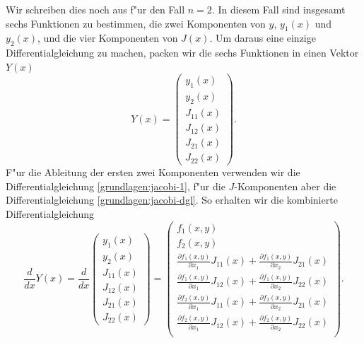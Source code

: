Wir schreiben dies noch aus f"ur den Fall $n=2$.
In diesem Fall sind insgesamt sechs Funktionen zu bestimmen, die
zwei Komponenten von $y$, $y_1(x)$ und $y_2(x)$, und die vier
Komponenten von $J(x)$.
Um daraus eine einzige Differentialgleichung zu machen, packen wir
die sechs Funktionen in einen Vektor $Y(x)$
\[
Y(x)=
\begin{pmatrix}
y_1(x)\\
y_2(x)\\
J_{11}(x)\\
J_{12}(x)\\
J_{21}(x)\\
J_{22}(x)
\end{pmatrix}.
\]
F"ur die Ableitung der ersten zwei Komponenten verwenden wir die
Differentialgleichung \eqref{grundlagen:jacobi-1}, f"ur die $J$-Komponenten
aber die Differentialgleichung \eqref{grundlagen:jacobi-dgl}.
So erhalten wir die kombinierte Differentialgleichung
\begin{equation}
\frac{d}{dx}Y(x)
=
\frac{d}{dx}
\begin{pmatrix}
y_1(x)\\
y_2(x)\\
J_{11}(x)\\
J_{12}(x)\\
J_{21}(x)\\
J_{22}(x)
\end{pmatrix}
=
\begin{pmatrix}
f_1(x,y)\\
f_2(x,y)\\
\displaystyle
\frac{\partial f_1(x,y)}{\partial x_1} J_{11}(x)
	+\frac{\partial f_1(x,y)}{\partial x_2} J_{21}(x)\\
\displaystyle
\frac{\partial f_1(x,y)}{\partial x_1} J_{12}(x)
	+\frac{\partial f_1(x,y)}{\partial x_2} J_{22}(x)\\
\displaystyle
\frac{\partial f_2(x,y)}{\partial x_1} J_{11}(x)
	+\frac{\partial f_2(x,y)}{\partial x_2} J_{21}(x)\\
\displaystyle
\frac{\partial f_2(x,y)}{\partial x_1} J_{12}(x)
	+\frac{\partial f_2(x,y)}{\partial x_2} J_{22}(x)\\
\end{pmatrix}.
\end{equation}

